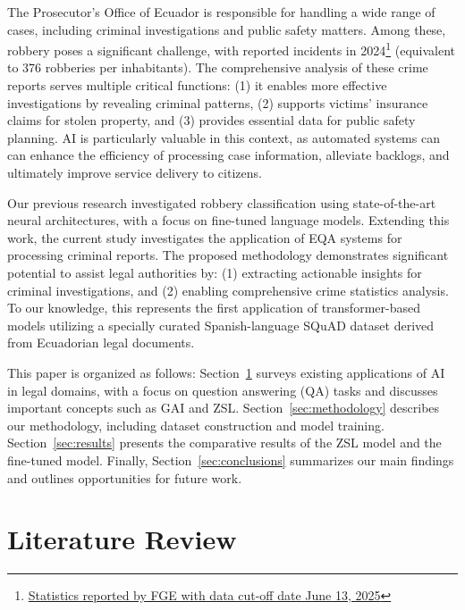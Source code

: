 \documentclass[runningheads]{llncs}
\begin{document}
The Prosecutor’s Office of Ecuador is responsible for handling a wide
range of cases, including criminal investigations and public safety
matters. Among these, robbery poses a significant challenge, with
 reported incidents in
2024\footnote{\hyperref{https://www.fiscalia.gob.ec/analitica-cifras-de-robo/}{FGE's
    Theft Statistics}{FGE's Theft Statistics}{Statistics reported by
    FGE with data cut-off date June 13, 2025}} (equivalent to 376
robberies per  inhabitants). The comprehensive
analysis of these crime reports serves multiple critical functions:
(1) it enables more effective investigations by revealing criminal
patterns, (2) supports victims' insurance claims for stolen property,
and (3) provides essential data for public safety planning. \Ac{AI} is
particularly valuable in this context, as automated systems can can
enhance the efficiency of processing case information, alleviate
backlogs, and ultimately improve service delivery to citizens.

Our previous research investigated robbery classification using
state-of-the-art neural architectures, with a focus on fine-tuned
language models. Extending this work, the current study investigates
the application of \ac{EQA} systems for processing criminal
reports. The proposed methodology demonstrates significant potential
to assist legal authorities by: (1) extracting actionable insights for
criminal investigations, and (2) enabling comprehensive crime
statistics analysis. To our knowledge, this represents the first
application of transformer-based models utilizing a specially curated
Spanish-language \ac{SQuAD} dataset derived from Ecuadorian legal
documents.

This paper is organized as follows:
Section~\ref{sec:literature-review} surveys existing applications of
\ac{AI} in legal domains, with a focus on question answering (\ac{QA})
tasks and discusses important concepts such as \ac{GAI} and
\ac{ZSL}. Section~\ref{sec:methodology} describes our methodology,
including dataset construction and model
training. Section~\ref{sec:results} presents the comparative results
of the \ac{ZSL} model and the fine-tuned model. Finally,
Section~\ref{sec:conclusions} summarizes our main findings and
outlines opportunities for future work.


\section{Literature Review}
\label{sec:literature-review}
\end{document}
